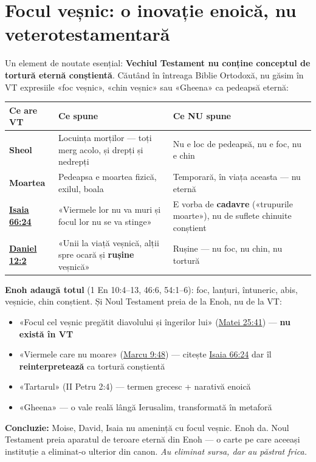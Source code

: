 \documentclass[12pt,a4paper,twoside,openany]{book}
\begin{document}
\chapter{Focul veșnic: o inovație enoică, nu veterotestamentară}\label{foc-vesnic}
Un element de noutate esențial: \textbf{Vechiul Testament nu conține conceptul de tortură eternă conștientă}. Căutând în întreaga Biblie Ortodoxă, nu găsim în VT expresiile «foc veșnic», «chin veșnic» sau «Gheena» ca pedeapsă eternă:

\begin{center}
\small
\begin{tabular}{L{1.2cm}L{6.2cm}L{7.5cm}}
\toprule
{}
\textbf{Ce are VT} & \textbf{Ce spune} & \textbf{Ce NU spune} \\
\midrule
\textbf{Sheol} & Locuința morților — toți merg acolo, și drepți și nedrepți & Nu e loc de pedeapsă, nu e foc, nu e chin \\
\textbf{Moartea} & Pedeapsa e moartea fizică, exilul, boala & Temporară, în viața aceasta — nu eternă \\
\textbf{\href{https://bibliaortodoxa.ro/carte.php?id=43\&cap=66\#24}{Isaia 66:24}} & «Viermele lor nu va muri și focul lor nu se va stinge» & E vorba de \textbf{cadavre} («trupurile moarte»), nu de suflete chinuite conștient \\
\textbf{\href{https://bibliaortodoxa.ro/carte.php?id=16\&cap=12\#2}{Daniel 12:2}} & «Unii la viață veșnică, alții spre ocară și \textbf{rușine} veșnică» & Rușine — nu foc, nu chin, nu tortură \\
\bottomrule
\end{tabular}
\end{center}
\normalsize
\textbf{Enoh adaugă totul} (1 En 10:4–13, 46:6, 54:1–6): foc, lanțuri, întuneric, abis, veșnicie, chin conștient. Și Noul Testament preia de la Enoh, nu de la VT:

\begin{itemize}
  \item «Focul cel veșnic pregătit diavolului și îngerilor lui» (\href{https://bibliaortodoxa.ro/carte.php?id=55\&cap=25\#41}{Matei 25:41}) — \textbf{nu există în VT}
  \item «Viermele care nu moare» (\href{https://bibliaortodoxa.ro/carte.php?id=53\&cap=9\#48}{Marcu 9:48}) — citește \href{https://bibliaortodoxa.ro/carte.php?id=43\&cap=66\#24}{Isaia 66:24} dar îl \textbf{reinterpretează} ca tortură conștientă
  \item «Tartarul» (II Petru 2:4) — termen grecesc + narativă enoică
  \item «Gheena» — o vale reală lângă Ierusalim, transformată în metaforă
\end{itemize}
\textbf{Concluzie:} Moise, David, Isaia nu amenință cu focul veșnic. Enoh da. Noul Testament preia aparatul de teroare eternă din Enoh — o carte pe care aceeași instituție a eliminat-o ulterior din canon. \textit{Au eliminat sursa, dar au păstrat frica.}
\end{document}
